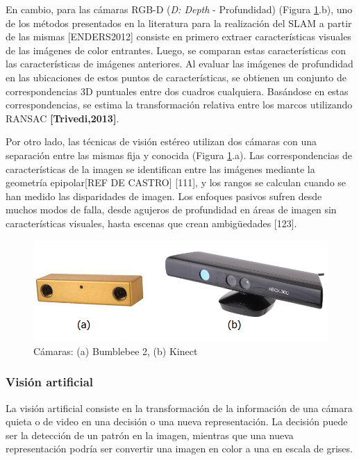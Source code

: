 En cambio, para las cámaras RGB-D (\textit{D: Depth} - Profundidad) (Figura \ref{fig:camaras}.b), uno de los métodos presentados en la literatura para la realización del SLAM a partir de las mismas [ENDERS2012] consiste en primero extraer características visuales de las imágenes de color entrantes. Luego, se comparan estas características con las características de imágenes anteriores. Al evaluar las imágenes de profundidad en las ubicaciones de estos puntos de características, se obtienen un conjunto de correspondencias 3D puntuales entre dos cuadros cualquiera. Basándose en estas correspondencias, se estima la transformación relativa entre los marcos utilizando RANSAC \textbf{[Trivedi,2013]}.

Por otro lado, las técnicas de visión estéreo utilizan dos cámaras con una separación entre las mismas fija y conocida (Figura \ref{fig:camaras}.a). Las correspondencias de características de la imagen se identifican entre las imágenes mediante la geometría epipolar[REF DE CASTRO] [111], y los rangos se calculan cuando se han medido las disparidades de imagen. Los enfoques pasivos sufren desde muchos modos de falla, desde agujeros de profundidad en áreas de imagen sin características visuales, hasta escenas que crean ambigüedades [123].

\begin{figure}
    \centering
    \includegraphics[width=.9\textwidth]{Img/bumblekinect}
    \caption{Cámaras: (a) Bumblebee 2, (b) Kinect}
    \label{fig:camaras}
\end{figure}

\subsubsection{Visión artificial}
La visión artificial consiste en la transformación de la información de una cámara quieta o de video en una decisión o una nueva representación. La decisión puede ser la detección de un patrón en la imagen, mientras que una nueva representación podría ser convertir una imagen en color a una en escala de grises.

